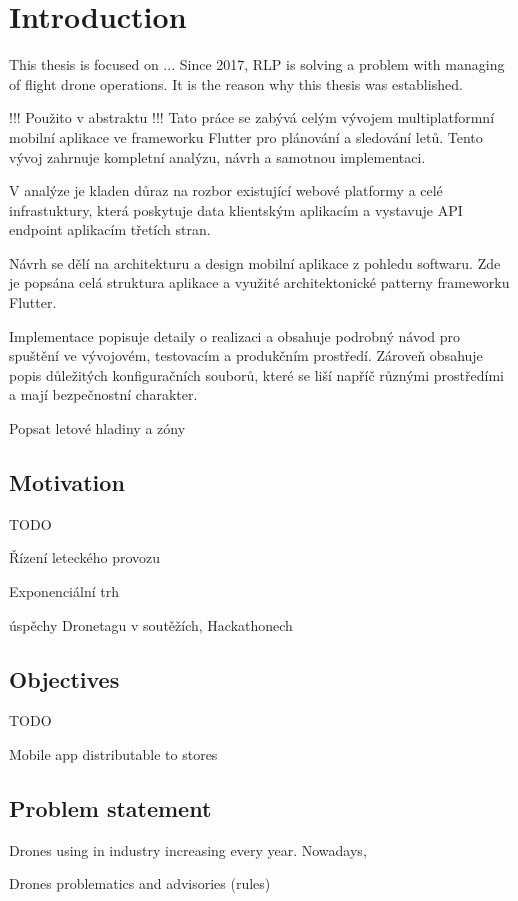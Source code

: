 \chapter{Introduction}\label{ch:introduction}
This thesis is focused on ...
Since 2017, RLP is solving a problem with managing of flight drone operations.
It is the reason why this thesis was established.

!!! Použito v abstraktu !!!
Tato práce se zabývá celým vývojem multiplatformní mobilní aplikace ve frameworku Flutter pro plánování a sledování letů.
Tento vývoj zahrnuje kompletní analýzu, návrh a samotnou implementaci.

V analýze je kladen důraz na rozbor existující webové platformy a celé infrastuktury, která poskytuje data klientským aplikacím a vystavuje API endpoint aplikacím třetích stran.

Návrh se dělí na architekturu a design mobilní aplikace z pohledu softwaru.
Zde je popsána celá struktura aplikace a využité architektonické patterny frameworku Flutter.

Implementace popisuje detaily o realizaci a obsahuje podrobný návod pro spuštění ve vývojovém, testovacím a produkčním prostředí.
Zároveň obsahuje popis důležitých konfiguračních souborů, které se liší napříč různými prostředími a mají bezpečnostní charakter.

Popsat letové hladiny a zóny

\section{Motivation}\label{sec:motivation}
TODO

Řízení leteckého provozu

Exponenciální trh

úspěchy Dronetagu v soutěžích, Hackathonech


\section{Objectives}\label{sec:objectives}
TODO

Mobile app distributable to stores

\section{Problem statement}\label{sec:problem-statement}
Drones using in industry increasing every year.
Nowadays,

Drones problematics and advisories (rules)
